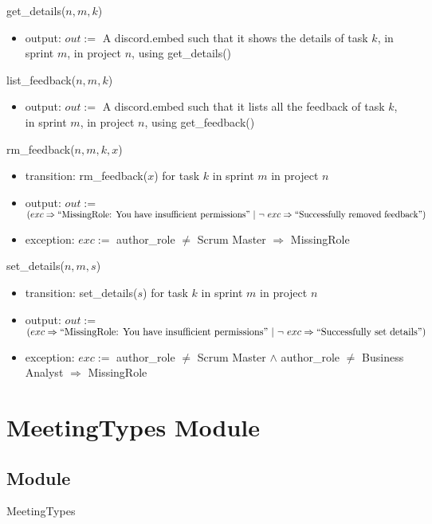 \documentclass[12pt, titlepage]{article}
\begin{document}
\noindent get\_details($n, m, k$)
\begin{itemize}
    \item output: $out :=$ A discord.embed such that it shows the details of task $k$, in sprint $m$, in project $n$, using get\_details()
\end{itemize}

\noindent list\_feedback($n, m, k$)
\begin{itemize}
    \item output: $out :=$ A discord.embed such that it lists all the feedback of task $k$, in sprint $m$, in project $n$, using get\_feedback()
\end{itemize}

\noindent rm\_feedback($n, m, k, x$)
\begin{itemize}
    \item transition: rm\_feedback($x$) for task $k$ in sprint $m$ in project $n$
    \item output: $out :=$ $(exc \Rightarrow ``\text{MissingRole: You have insufficient permissions}"\ |\ \lnot\ exc \Rightarrow ``\text{Successfully removed feedback}")$
    \item exception: $exc :=$ author\_role $\neq$ Scrum Master $\Rightarrow$ MissingRole
\end{itemize}

\noindent set\_details($n, m, s$)
\begin{itemize}
    \item transition: set\_details($s$) for task $k$ in sprint $m$ in project $n$
    \item output: $out :=$ $(exc \Rightarrow ``\text{MissingRole: You have insufficient permissions}"\ |\ \lnot\ exc \Rightarrow ``\text{Successfully set details}")$
    \item exception: $exc :=$ author\_role $\neq$ Scrum Master $\land$ author\_role $\neq$ Business Analyst $\Rightarrow$ MissingRole
\end{itemize}

\newpage

\section* {MeetingTypes Module}

\subsection* {Module}
MeetingTypes
\end{document}
